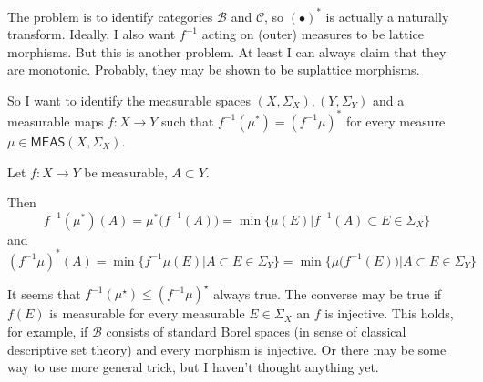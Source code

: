 \documentclass[12pt]{scrartcl}
\renewcommand{\.}{\; . \;}
\begin{document}
The problem is to identify categories $\mathcal{B}$ and $\mathcal{C}$, so $(\bullet)^*$ is actually a naturally transform. Ideally, I also want $f^{-1}$ acting on (outer) measures to be lattice morphisms. But this is another problem. At least I can always claim that they are monotonic. Probably, they may be shown to be suplattice morphisms.

So I want to identify the measurable spaces $(X,\Sigma_X),(Y,\Sigma_Y)$ and a measurable 
 maps $f : X \to Y$ such that $ f^{-1}(\mu^*) = (f^{-1}\mu)^*$ for every measure $\mu \in \mathsf{MEAS}(X,\Sigma_X)$. 

Let $f : X \to Y$ be measurable, $A \subset Y$. 

Then $$
f^{-1}(\mu^*)(A) = \mu^*\big(f^{-1}(A)\big) = 
\min\Big\{  \mu(E) \Big|  f^{-1}(A) \subset   E \in \Sigma_X \Big\} 
$$ 
and
$$
(f^{-1}\mu)^*(A)  =  \min\Big\{  f^{-1}\mu(E) \Big|  A \subset   E \in \Sigma_Y \Big\}=
 \min\Big\{  \mu\big(f^{-1}(E)\big) \Big|  A \subset   E \in \Sigma_Y \Big\}
$$

It seems that $f^{-1}(\mu^\star) \le (f^{-1} \mu)^\star$ always true. The converse may be true if $f(E)$ is measurable for every measurable $E \in \Sigma_X$ an $f$ is injective. This holds, for example, if $\mathcal{B}$ consists of standard Borel spaces (in sense of classical descriptive set theory) and every morphism is injective. Or there may be some way to use more general trick, but I haven't thought anything yet.
\newpage
\end{document}

